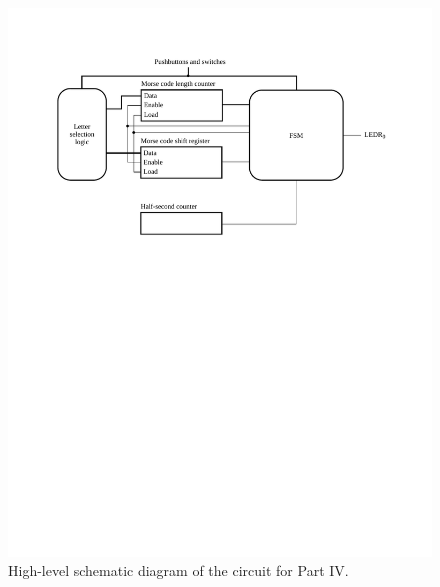 \documentclass[epsfig,10pt,fullpage]{article}
\newcommand{\CommonDocsPath}{../../../common/docs}
\begin{document}
\begin{figure} [H]
\begin{center}
	\includegraphics[scale = 0.9]{figures/fig_morse_code_circuit_schematic.pdf}
\end{center}
\caption{High-level schematic diagram of the circuit for Part IV.}
\label{fig:morse_code_cct}
\end{figure}



\end{document}
